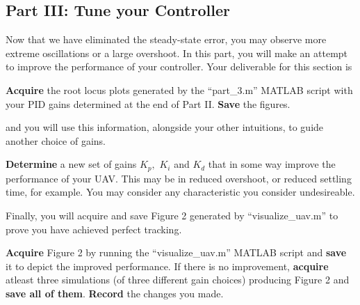 \subsection{Part III: Tune your Controller}
Now that we have eliminated the steady-state error, you may observe more extreme oscillations or a large overshoot.
In this part, you will make an attempt to improve the performance of your controller.
Your deliverable for this section is
%
\begin{deliverable}[label={del:lab4:p3:1}]
  \textbf{Acquire} the root locus plots generated by the ``part\_3.m'' MATLAB script with your PID gains determined at the end of Part II.
  \textbf{Save} the figures.
\end{deliverable}
%
and you will use this information, alongside your other intuitions, to guide another choice of gains.
%
\begin{deliverable}[label={del:lab4:p3:2}]
  \textbf{Determine} a new set of gains \(K_p,\) \(K_i\) and \(K_d\) that in some way improve the performance of your UAV.
  This may be in reduced overshoot, or reduced settling time, for example.
  You may consider any characteristic you consider undesireable.
\end{deliverable}
%
Finally, you will acquire and save Figure 2 generated by ``visualize\_uav.m'' to prove you have achieved perfect tracking.
%
\begin{deliverable}[label={del:lab4:p3:3}]
  \textbf{Acquire} Figure 2 by running the ``visualize\_uav.m'' MATLAB script and \textbf{save} it to depict the improved performance.
  If there is no improvement, \textbf{acquire} atleast three simulations (of three different gain choices) producing Figure 2 and \textbf{save all of them}. \textbf{Record} the changes you made.
\end{deliverable}
%
